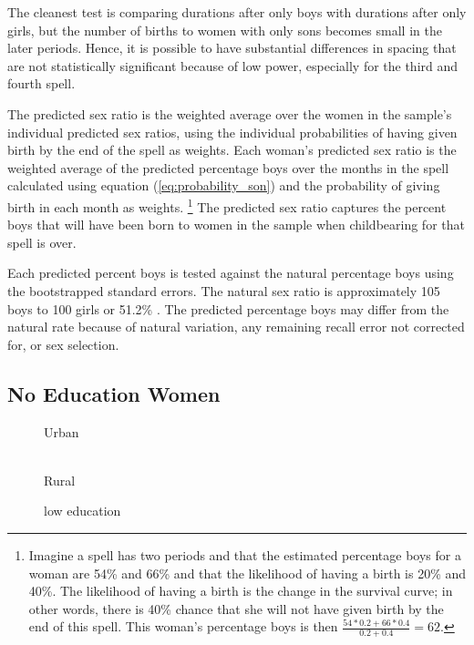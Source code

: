 \documentclass[12pt,letterpaper]{article}
\begin{document}
The cleanest test is comparing durations after only boys with durations after
only girls, but the number of births to women with only sons becomes small 
in the later periods.
Hence, it is possible to have substantial differences in spacing that are
not statistically significant because of low power, especially for the third 
and fourth spell.

The predicted sex ratio is the weighted average over the women in the sample's 
individual predicted sex ratios, using the individual probabilities of having
given birth by the end of the spell as weights.
Each woman's predicted sex ratio is the weighted average of the predicted
percentage boys over the months in the spell calculated using equation 
(\ref{eq:probability_son}) and the probability of giving birth in each month 
as weights.%
\footnote{
Imagine a spell has two periods and that the estimated percentage boys for a
woman are 54\% and 66\% and that the likelihood of having a birth is 20\% and 40\%.
The likelihood of having a birth is the change in the survival curve; 
in other words, there is 40\% chance that she will not have given birth by the end of 
this spell.
This woman's percentage boys is then $\frac{54*0.2+66*0.4}{0.2+0.4} = 62$.
}
The predicted sex ratio captures the percent boys that will have been born to women 
in the sample when childbearing for that spell is over.

Each predicted percent boys is tested against the natural percentage 
boys using the bootstrapped standard errors.
The natural sex ratio is approximately 105 boys to 100 girls or
51.2\% \citep{ben-porath76b,jacobsen99,Portner2015b}.
The predicted percentage boys may differ from the natural rate because of 
natural variation, any remaining recall error not corrected for, or 
sex selection. 

\subsection{No Education Women}

\begin{figure}[htpb]
\centering
\caption*{Urban}
\\
\caption*{Rural}
\caption{low education}
\end{figure}
\end{document}
